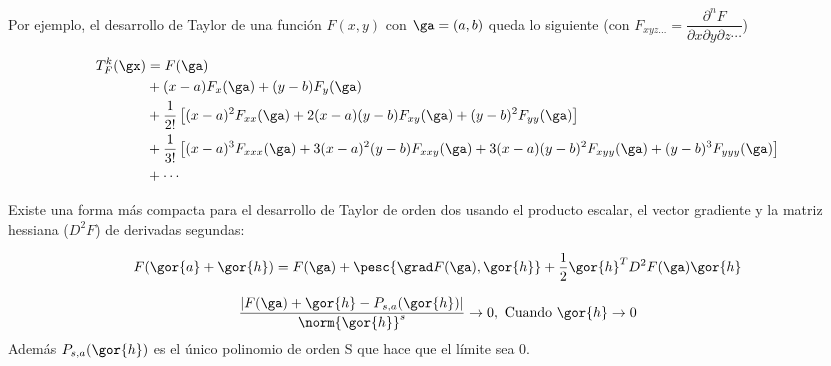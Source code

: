 Por ejemplo, el desarrollo de Taylor de una función $F(x,y)$ con $\ga = (a,b)$ queda lo siguiente (con $F_{xyz\dotsc} = \dfrac{\partial^nF}{\partial x \partial y \partial z \dotsb}$)

\begin{align*}
T^k_{F}(\gx) &= F(\ga) \\
& +  (x - a) F_x(\ga) + (y - b) F_y(\ga)  \\
& +\frac{1}{2!}\left[(x-a)^2F_{xx}(\ga) + 2(x-a)(y-b)F_{xy}(\ga) + (y-b)^2F_{yy}(\ga)\right] \\
& +\frac{1}{3!}\left[(x-a)^3F_{xxx}(\ga) + 3(x-a)^2(y-b)F_{xxy}(\ga) + 3(x-a)(y-b)^2 F_{xyy} (\ga) + (y-b)^3F_{yyy} (\ga)\right] \\
& +\dotsb
\end{align*}

Existe una forma más compacta para el desarrollo de Taylor de orden dos usando el producto escalar, el vector gradiente y la matriz hessiana ($D^2F$) de derivadas segundas:

\[ F(\gor{a}+\gor{h}) = F(\ga) + \pesc{\grad F(\ga),\gor{h}} + \frac{1}{2} \gor{h}^T D^2F(\ga)\gor{h} \]

\begin{theorem}
 $$\frac{|F(\ga)+\gor{h} - P_{s,a}(\gor{h})|}{\norm{\gor{h}}^s} \rightarrow 0, \text{ Cuando } \gor{h} \rightarrow 0$$
 Además $P_{s,a}(\gor{h})$ es el único polinomio de orden S que hace que el límite sea 0.
\end{theorem}


